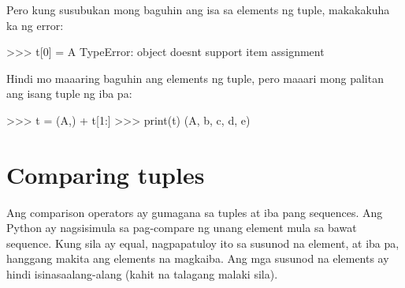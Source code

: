 \documentclass[10pt,]{book}
\newenvironment{Shaded}{}{}
\newcommand{\BuiltInTok}[1]{\textcolor[rgb]{0.00,0.50,0.00}{#1}}
\newcommand{\DecValTok}[1]{\textcolor[rgb]{0.25,0.63,0.44}{#1}}
\newcommand{\NormalTok}[1]{#1}
\newcommand{\OperatorTok}[1]{\textcolor[rgb]{0.40,0.40,0.40}{#1}}
\newcommand{\PreprocessorTok}[1]{\textcolor[rgb]{0.74,0.48,0.00}{#1}}
\newcommand{\StringTok}[1]{\textcolor[rgb]{0.25,0.44,0.63}{#1}}
\begin{document}
Pero kung susubukan mong baguhin ang isa sa elements ng tuple,
makakakuha ka ng error:

  

\begin{Shaded}
\begin{Highlighting}[]
\OperatorTok{\textgreater{}\textgreater{}\textgreater{}}\NormalTok{ t[}\DecValTok{0}\NormalTok{] }\OperatorTok{=} \StringTok{\textquotesingle{}A\textquotesingle{}}
\PreprocessorTok{TypeError}\NormalTok{: }\BuiltInTok{object}\NormalTok{ doesn}\StringTok{\textquotesingle{}t support item assignment}
\end{Highlighting}
\end{Shaded}

Hindi mo maaaring baguhin ang elements ng tuple, pero maaari mong
palitan ang isang tuple ng iba pa:

\begin{Shaded}
\begin{Highlighting}[]
\OperatorTok{\textgreater{}\textgreater{}\textgreater{}}\NormalTok{ t }\OperatorTok{=}\NormalTok{ (}\StringTok{\textquotesingle{}A\textquotesingle{}}\NormalTok{,) }\OperatorTok{+}\NormalTok{ t[}\DecValTok{1}\NormalTok{:]}
\OperatorTok{\textgreater{}\textgreater{}\textgreater{}} \BuiltInTok{print}\NormalTok{(t)}
\NormalTok{(}\StringTok{\textquotesingle{}A\textquotesingle{}}\NormalTok{, }\StringTok{\textquotesingle{}b\textquotesingle{}}\NormalTok{, }\StringTok{\textquotesingle{}c\textquotesingle{}}\NormalTok{, }\StringTok{\textquotesingle{}d\textquotesingle{}}\NormalTok{, }\StringTok{\textquotesingle{}e\textquotesingle{}}\NormalTok{)}
\end{Highlighting}
\end{Shaded}

\section{Comparing tuples}\label{comparing-tuples}

  

Ang comparison operators ay gumagana sa tuples at iba pang sequences.
Ang Python ay nagsisimula sa pag-compare ng unang element mula sa bawat
sequence. Kung sila ay equal, nagpapatuloy ito sa susunod na element, at
iba pa, hanggang makita ang elements na magkaiba. Ang mga susunod na
elements ay hindi isinasaalang-alang (kahit na talagang malaki sila).
\end{document}
